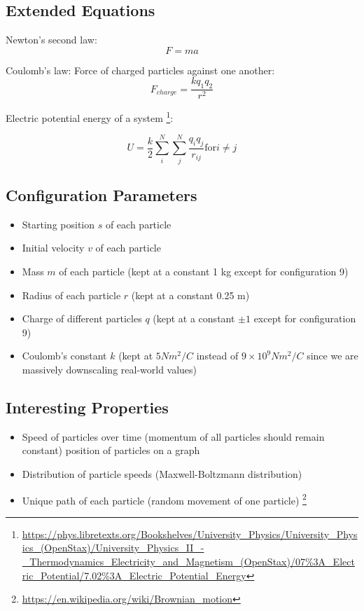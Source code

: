 \documentclass{article}
\begin{document}
\subsection{Extended Equations}

Newton's second law:
\begin{equation}
F = ma
\end{equation}

Coulomb's law: Force of charged particles against one another:
\begin{equation}
    F_{charge} = \frac{kq_1q_2}{r^2}
\end{equation}

Electric potential energy of a system
\footnote{\url{https://phys.libretexts.org/Bookshelves/University_Physics/University_Physics_(OpenStax)/University_Physics_II_-_Thermodynamics_Electricity_and_Magnetism_(OpenStax)/07\%3A_Electric_Potential/7.02\%3A_Electric_Potential_Energy}}:

\begin{equation}
    U = \frac{k}{2} \sum_i^N \sum_j^N \frac{q_iq_j}{r_{ij}} \text{for} i \neq j
\end{equation}

\subsection{Configuration Parameters}
\begin{itemize}
    \item Starting position $s$ of each particle
    \item Initial velocity $v$ of each particle
    \item Mass $m$ of each particle (kept at a constant 1 kg except for configuration 9)
    \item Radius of each particle $r$ (kept at a constant 0.25 m)
    \item Charge of different particles $q$ (kept at a constant $\pm 1$ except for configuration 9)
    \item Coulomb's constant $k$ (kept at $5 Nm^2/C$ instead of $9\times 10^9 Nm^2/C$ since we are massively downscaling real-world values)
\end{itemize}

\subsection{Interesting Properties}
\begin{itemize}
    \item Speed of particles over time (momentum of all particles should remain constant) position of particles on a graph
    \item Distribution of particle speeds (Maxwell-Boltzmann distribution)
    \item Unique path of each particle (random movement of one particle) \footnote{\url{https://en.wikipedia.org/wiki/Brownian_motion}}
\end{itemize}
\end{document}

